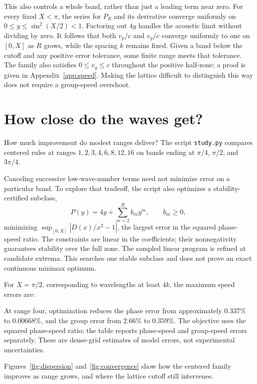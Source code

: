 \documentclass[11pt]{article}
\begin{document}
This also controls a whole band, rather than just a leading term near zero. For every fixed $X<\pi$, the series for $P_R$ and its derivative converge uniformly on $0\leq y\leq\sin^2(X/2)<1$. Factoring out $4y$ handles the acoustic limit without dividing by zero. It follows that both $v_p/c$ and $v_g/c$ converge uniformly to one on $[0,X]$ as $R$ grows, while the spacing $k$ remains fixed. Given a band below the cutoff and any positive error tolerance, some finite range meets that tolerance. The family also satisfies $0\leq v_g\leq c$ throughout the positive half-zone; a proof is given in Appendix~\ref{app:speed}. Making the lattice difficult to distinguish this way does not require a group-speed overshoot.

\section{How close do the waves get?}
How much improvement do modest ranges deliver? The script \texttt{study.py} compares centered rules at ranges $1,2,3,4,6,8,12,16$ on bands ending at $\pi/4$, $\pi/2$, and $3\pi/4$.

Canceling successive low-wave-number terms need not minimize error on a particular band. To explore that tradeoff, the script also optimizes a stability-certified subclass,
\begin{equation}
 P(y)=4y+\sum_{m=2}^R b_m y^m,\qquad b_m\geq0,
\end{equation}
minimizing $\sup_{[0,X]}|D(x)/x^2-1|$, the largest error in the squared phase-speed ratio. The constraints are linear in the coefficients; their nonnegativity guarantees stability over the full zone. The sampled linear program is refined at candidate extrema. This searches one stable subclass and does not prove an exact continuous minimax optimum.

For $X=\pi/2$, corresponding to wavelengths at least $4k$, the maximum speed errors are:
\begin{center}
\small

\end{center}
At range four, optimization reduces the phase error from approximately $0.337\%$ to $0.00668\%$, and the group error from $2.66\%$ to $0.359\%$. The objective uses the squared phase-speed ratio; the table reports phase-speed and group-speed errors separately. These are dense-grid estimates of model errors, not experimental uncertainties.

Figures~\ref{fig:dispersion} and~\ref{fig:convergence} show how the centered family improves as range grows, and where the lattice cutoff still intervenes.
\end{document}
